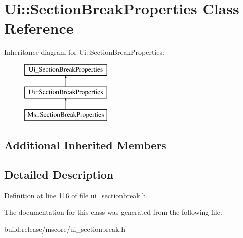 \hypertarget{class_ui_1_1_section_break_properties}{}\section{Ui\+:\+:Section\+Break\+Properties Class Reference}
\label{class_ui_1_1_section_break_properties}
Inheritance diagram for Ui\+:\+:Section\+Break\+Properties\+:\begin{figure}[H]
\begin{center}
\leavevmode
\includegraphics[height=3.000000cm]{class_ui_1_1_section_break_properties}
\end{center}
\end{figure}
\subsection*{Additional Inherited Members}


\subsection{Detailed Description}


Definition at line 116 of file ui\+\_\+sectionbreak.\+h.



The documentation for this class was generated from the following file\+:\begin{DoxyCompactItemize}
\item 
build.\+release/mscore/ui\+\_\+sectionbreak.\+h\end{DoxyCompactItemize}
